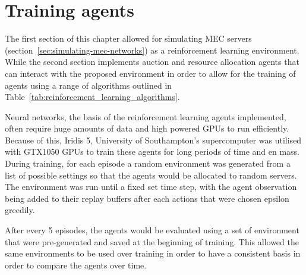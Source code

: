 \section{Training agents}\label{sec:training-agents}
The first section of this chapter allowed for simulating MEC servers
(section~\ref{sec:simulating-mec-networks}) as a reinforcement learning environment. While the second
section implements auction and resource allocation agents that can interact with the proposed environment in order
to allow for the training of agents using a range of algorithms outlined in
Table~\ref{tab:reinforcement_learning_algorithms}.

Neural networks, the basis of the reinforcement learning agents implemented, often require huge amounts of data and
high powered GPUs to run efficiently. Because of this, Iridis 5, University of Southampton's supercomputer was utilised
with GTX1050 GPUs to train these agents for long periods of time and en mass. During training, for each episode a
random environment was generated from a list of possible settings so that the agents would be allocated to random
servers. The environment was run until a fixed set time step, with the agent observation being added to their replay
buffers after each actions that were chosen epsilon greedily.

After every 5 episodes, the agents would be evaluated using a set of environment that were pre-generated and
saved at the beginning of training. This allowed the same environments to be used over training in order to have a
consistent basis in order to compare the agents over time.

